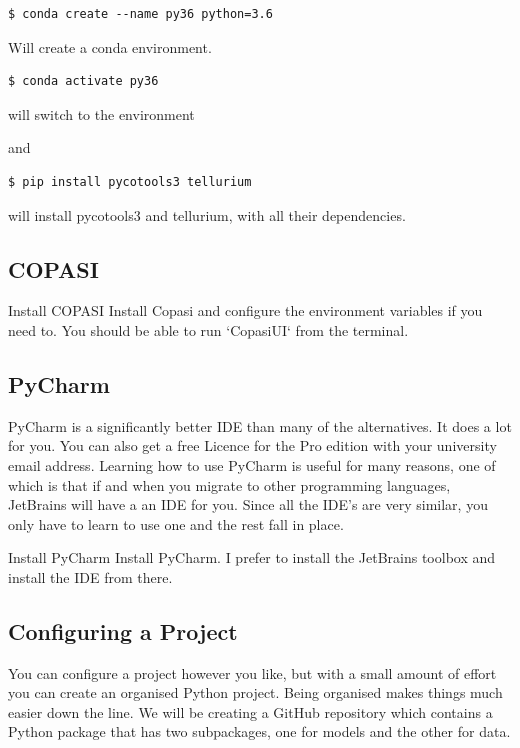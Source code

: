 \documentclass[../main]{subfiles}
\begin{document}
\begin{verbatim}
$ conda create --name py36 python=3.6
\end{verbatim}

Will create a conda environment.

\begin{verbatim}
$ conda activate py36
\end{verbatim}

will switch to the environment

and

\begin{verbatim}
$ pip install pycotools3 tellurium
\end{verbatim}

will install pycotools3 and tellurium, with all their dependencies.


\subsection{COPASI}

\begin{Task}{Install COPASI}
Install Copasi and configure the environment variables if you need to. You should be able to
run `CopasiUI` from the terminal.
\end{Task}

\subsection{PyCharm}
PyCharm is a significantly better IDE than many of the alternatives. It does a lot for you. You can also
get a free Licence for the Pro edition with your university email address. Learning how to use
PyCharm is useful for many reasons, one of which is that if and when you migrate to other programming
languages, JetBrains will have a an IDE for you. Since all the IDE's are very similar, you only have
to learn to use one and the rest fall in place.

\begin{Task}{Install PyCharm}
Install PyCharm. I prefer to install the JetBrains toolbox and install the IDE from there.
\end{Task}

\subsection{Configuring a Project}
You can configure a project however you like, but with a small amount of effort you can create an
organised Python project. Being organised makes things much easier down the line. We will be creating a
GitHub repository which contains a Python package that has two subpackages, one for models and the other
for data.
\end{document}
